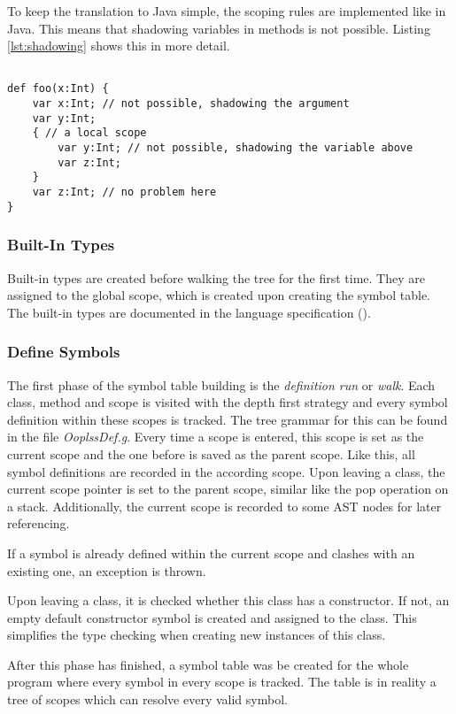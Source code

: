 To keep the translation to Java simple, the scoping rules are implemented
like in Java. This means that shadowing variables in methods is not possible.
Listing \ref{lst:shadowing} shows this in more detail.

\begin{lstlisting}[float=ht,language=ooplss,caption=Shadowing variables,label=lst:shadowing]

def foo(x:Int) {
	var x:Int; // not possible, shadowing the argument
	var y:Int;
	{ // a local scope
		var y:Int; // not possible, shadowing the variable above
		var z:Int;
	}
	var z:Int; // no problem here
}
\end{lstlisting}

\subsubsection{Built-In Types}
Built-in types are created before walking the tree for the first time.
They are assigned to the global scope, which is created upon creating the symbol
table. The built-in types are documented in the language specification 
().

\subsubsection{Define Symbols}
The first phase of the symbol table building is the \emph{definition run}
or \emph{walk}. Each class, method and scope is visited with the
depth first strategy and every symbol definition within these scopes
is tracked. The tree grammar for this can be found in the file
\emph{OoplssDef.g}. Every time a scope is entered, this scope is set
as the current scope and the one before is saved as the parent scope.
Like this, all symbol definitions are recorded in the according scope.
Upon leaving a class, the current scope pointer is set to
the parent scope, similar like the pop operation on a stack.
Additionally, the current scope is recorded to some AST nodes for later
referencing.

If a symbol is already defined within the current scope and clashes with
an existing one, an exception is thrown.

Upon leaving a class, it is checked whether this class has a constructor.
If not, an empty default constructor symbol is created and assigned to the
class. This simplifies the type checking when creating new instances
of this class.

After this phase has finished, a symbol table was be created for the whole 
program where every symbol in every scope is tracked. The table is in reality 
a tree of scopes which can resolve every valid symbol.

